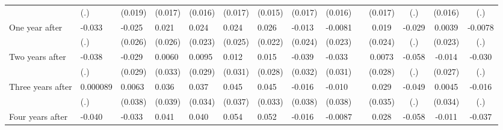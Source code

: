 \begin{tabular}{lccccrrrrrcccc}
      & \multicolumn{1}{l}{(.)} & \multicolumn{1}{l}{(0.019)} & \multicolumn{1}{l}{(0.017)} & \multicolumn{1}{l}{(0.016)} & \multicolumn{1}{l}{(0.017)} & \multicolumn{1}{l}{(0.015)} & \multicolumn{1}{l}{(0.017)} & \multicolumn{1}{l}{(0.016)} &       & (0.017) & (.)   & (0.016) & (.) \\
One year after & \multicolumn{1}{l}{-0.033} & \multicolumn{1}{l}{-0.025} & \multicolumn{1}{l}{0.021} & \multicolumn{1}{l}{0.024} & \multicolumn{1}{l}{0.024} & \multicolumn{1}{l}{0.026} & \multicolumn{1}{l}{-0.013} & \multicolumn{1}{l}{-0.0081} &       & 0.019 & -0.029 & 0.0039 & -0.0078 \\
      & \multicolumn{1}{l}{(.)} & \multicolumn{1}{l}{(0.026)} & \multicolumn{1}{l}{(0.026)} & \multicolumn{1}{l}{(0.023)} & \multicolumn{1}{l}{(0.025)} & \multicolumn{1}{l}{(0.022)} & \multicolumn{1}{l}{(0.024)} & \multicolumn{1}{l}{(0.023)} &       & (0.024) & (.)   & (0.023) & (.) \\
Two years after & \multicolumn{1}{l}{-0.038} & \multicolumn{1}{l}{-0.029} & \multicolumn{1}{l}{0.0060} & \multicolumn{1}{l}{0.0095} & \multicolumn{1}{l}{0.012} & \multicolumn{1}{l}{0.015} & \multicolumn{1}{l}{-0.039} & \multicolumn{1}{l}{-0.033} &       & 0.0073 & -0.058 & -0.014 & -0.030 \\
      & \multicolumn{1}{l}{(.)} & \multicolumn{1}{l}{(0.029)} & \multicolumn{1}{l}{(0.033)} & \multicolumn{1}{l}{(0.029)} & \multicolumn{1}{l}{(0.031)} & \multicolumn{1}{l}{(0.028)} & \multicolumn{1}{l}{(0.032)} & \multicolumn{1}{l}{(0.031)} &       & (0.028) & (.)   & (0.027) & (.) \\
Three years after & \multicolumn{1}{l}{0.000089} & \multicolumn{1}{l}{0.0063} & \multicolumn{1}{l}{0.036} & \multicolumn{1}{l}{0.037} & \multicolumn{1}{l}{0.045} & \multicolumn{1}{l}{0.045} & \multicolumn{1}{l}{-0.016} & \multicolumn{1}{l}{-0.010} &       & 0.029 & -0.049 & 0.0045 & -0.016 \\
      & \multicolumn{1}{l}{(.)} & \multicolumn{1}{l}{(0.038)} & \multicolumn{1}{l}{(0.039)} & \multicolumn{1}{l}{(0.034)} & \multicolumn{1}{l}{(0.037)} & \multicolumn{1}{l}{(0.033)} & \multicolumn{1}{l}{(0.038)} & \multicolumn{1}{l}{(0.038)} &       & (0.035) & (.)   & (0.034) & (.) \\
Four years after & \multicolumn{1}{l}{-0.040} & \multicolumn{1}{l}{-0.033} & \multicolumn{1}{l}{0.041} & \multicolumn{1}{l}{0.040} & \multicolumn{1}{l}{0.054} & \multicolumn{1}{l}{0.052} & \multicolumn{1}{l}{-0.016} & \multicolumn{1}{l}{-0.0087} &       & 0.028 & -0.058 & -0.011 & -0.037 \\

\end{tabular}
